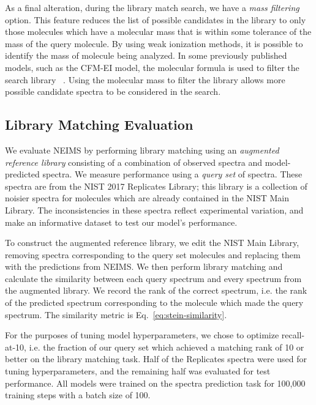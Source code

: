 As a final alteration, during the library match search, we have a \textit{mass filtering} option. This feature reduces the list of possible candidates in the library to only those molecules which have a molecular mass that is within some tolerance of the mass of the query molecule.
By using weak ionization methods, it is possible to identify the mass of molecule being analyzed. In some previously published models, such as the CFM-EI model, the molecular formula is used to filter the search library
~\cite{allen2016computational}. Using the molecular mass to filter the library allows more possible candidate spectra to be considered in the search.

\subsection{Library Matching Evaluation}\label{sec:library_matching_description}

We evaluate NEIMS by performing library matching using an \textit{augmented reference library} consisting of a combination of observed spectra and model-predicted spectra. We measure performance using a \textit{query set} of spectra. These spectra are from the NIST 2017 Replicates Library; this library is a collection of noisier spectra for molecules which are already contained in the NIST Main Library. The inconsistencies in these spectra reflect experimental variation, and make an informative dataset to test our model's performance.

To construct the augmented reference library, we edit the NIST Main Library, removing spectra corresponding to the query set molecules and replacing them with the predictions from NEIMS. 
We then perform library matching and calculate the similarity between each query spectrum and every spectrum from the augmented library. We record the rank of the correct spectrum, i.e. the rank of the predicted spectrum corresponding to the molecule which made the query spectrum. The similarity metric is Eq.~\eqref{eq:stein-similarity}.

For the purposes of tuning model hyperparameters, we chose to optimize recall-at-10, i.e. the fraction of our query set which achieved a matching rank of 10 or better on the library matching task. Half of the Replicates spectra were used for tuning hyperparameters, and the remaining half was evaluated for test performance. All models were trained on the spectra prediction task for 100,000 training steps with a batch size of 100.

